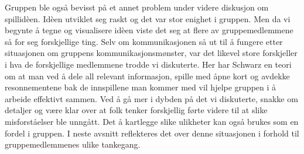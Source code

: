 Gruppen ble også bevisst på et annet problem under videre diskusjon om
spillidèen. Idèen utviklet seg raskt og det var stor enighet i gruppen.
Men da vi begynte å tegne og visualisere idèen viste det seg at flere av
gruppemedlemmene så for seg forskjellige ting. Selv om kommunikasjonen
så ut til å fungere etter situasjonen om gruppens kommunikasjonsmønster,
var det likevel store forskjeller i hva de forskjellige medlemmene
trodde vi diskuterte. Her har Schwarz en teori om at man ved å dele all relevant informasjon, spille med åpne kort og avdekke resonnementene bak de innspillene man kommer med vil hjelpe gruppen i å arbeide effektivt sammen. Ved å gå mer i dybden på det vi diskuterte, snakke om
detaljer og være klar over at folk tenker forskjellig førte videre til
at slike misforståelser ble unngått. Det å kartlegge slike ulikheter
kan også brukes som en fordel i gruppen. I neste avsnitt reflekteres det
over denne situasjonen i forhold til gruppemedlemmenes ulike tankegang.

